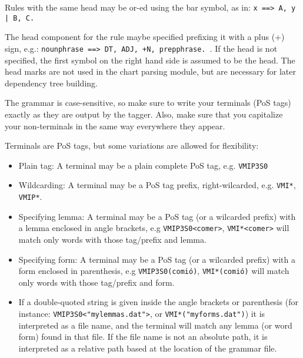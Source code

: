 \documentclass[a4paper]{book}
\begin{document}
   Rules with the same head may be or-ed using the bar symbol,
  as in: {\tt x ==> A, y | B, C.}

   The head component for the rule maybe specified prefixing it with a
   plus (+) sign, e.g.: {\tt nounphrase ==> DT, ADJ, +N, prepphrase. }.  
   If the head is not specified, the first symbol on
   the right hand side is assumed to be the head.  The head marks are
   not used in the chart parsing module, but are necessary for later
   dependency tree building.

   The grammar is case-sensitive, so make sure to write your terminals
  (PoS tags)  exactly as they are output by the tagger. Also, make
  sure that you capitalize your non-terminals in the same way
  everywhere they appear.

   Terminals are PoS tags, but some variations are allowed for
   flexibility:
   \begin{itemize}
     \item Plain tag:  A terminal may be a plain complete PoS tag,
     e.g. {\tt VMIP3S0}
     \item Wildcarding:  A terminal may be a PoS tag prefix,
     right-wilcarded, e.g. {\tt VMI*}, {\tt VMIP*}. 
    \item Specifying lemma: A terminal may be a PoS tag (or a
    wilcarded prefix) with a lemma enclosed in angle brackets,
     e.g  \verb#VMIP3S0<comer>#,  \verb#VMI*<comer># will match only
    words with those tag/prefix and lemma.
    \item Specifying form: A terminal may be a PoS tag (or a
    wilcarded prefix) with a form enclosed in parenthesis,
     e.g  {\tt VMIP3S0(comi\'o)},  {\tt VMI*(comi\'o)} will match only
    words with those tag/prefix and form.
    \item If a double-quoted string is given inside the angle brackets
      or parenthesis (for instance: \verb#VMIP3S0<"mylemmas.dat">#,
      or \verb#VMI*("myforms.dat")#) it is interpreted as a file
      name, and the terminal will match any lemma (or word form) found
      in that file.  If the file name is not an absolute path, it is
      interpreted as a relative path based at the location of the
      grammar file.
   \end{itemize}
\end{document}

